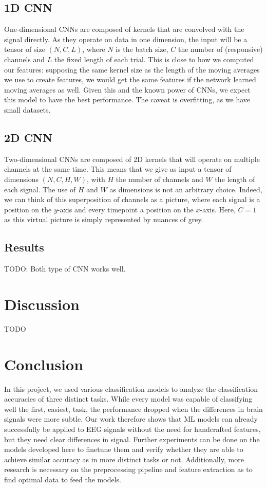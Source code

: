 \documentclass[10pt,conference,compsocconf]{IEEEtran}
\begin{document}
\subsection{1D CNN}
One-dimensional CNNs are composed of kernels that are convolved with the signal directly. As they operate on data in one dimension, the input will be a tensor of size \((N, C, L)\), where \(N\) is the batch size, \(C\) the number of (responsive) channels and \(L\) the fixed length of each trial. This is close to how we computed our features: supposing the same kernel size as the length of the moving averages we use to create features, we would get the same features if the network learned moving averages as well. Given this and the known power of CNNs, we expect this model to have the best performance. The caveat is overfitting, as we have small datasets.

\subsection{2D CNN}
Two-dimensional CNNs are composed of 2D kernels that will operate on multiple channels at the same time. This means that we give as input a tensor of dimensions \((N, C, H, W)\), with \(H\) the number of channels and \(W\) the length of each signal. The use of \(H\) and \(W\) as dimensions is not an arbitrary choice. Indeed, we can think of this superposition of channels as a picture, where each signal is a position on the \(y\)-axis and every timepoint a position on the \(x\)-axis. Here, \(C=1\) as this virtual picture is simply represented by nuances of grey.

\subsection{Results}
TODO: Both type of CNN works well.

\section{Discussion}
\label{sec:discussion}
TODO

\section{Conclusion}
\label{sec:conclusion}
In this project, we used various classification models to analyze the classification accuracies of three distinct tasks. While every model was capable of classifying well the first, easiest, task, the performance dropped when the differences in brain signals were more subtle. Our work therefore shows that ML models can already successfully be applied to EEG signals without the need for handcrafted features, but they need clear differences in signal. Further experiments can be done on the models developed here to finetune them and verify whether they are able to achieve similar accuracy as in more distinct tasks or not. Additionally, more research is necessary on the preprocessing pipeline and feature extraction as to find optimal data to feed the models.
\end{document}
